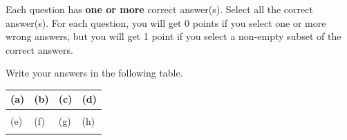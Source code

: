 
Each question has \textbf{one or more} correct answer(s). Select all the correct answer(s). For each question, you will get 0 points if you select one or more wrong answers, but you will get 1 point if you select a non-empty subset of the correct answers.

Write your answers in the following table.


\begin{table}[htbp]
    \centering
    \begin{tabular}{|p{2cm}|p{2cm}|p{2cm}|p{2cm}|}
        \hline
        (a) & (b) & (c) & (d) \\
        \hline
            &  &  &    \\
        \hline
        (e) & (f) & (g) & (h) \\
        \hline
            &  &  &   \\
        \hline
    \end{tabular}
\end{table}


